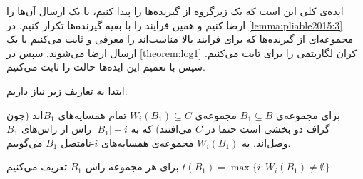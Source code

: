 ایده‌ی کلی این است که یک زیرگروه از گیرنده‌ها را پیدا کنیم، با یک ارسال آن‌ها را ارضا کنیم و همین فرایند را با بقیه گیرنده‌ها تکرار کنیم. در 
\autoref{lemma:pliable2015:3} 
مجموعه‌ای از گیرنده‌ها که برای فرایند بالا مناسب‌اند را معرفی و ثابت می‌کنیم با یک ارسال ارضا می‌شوند. سپس در 
\autoref{theorem:log1}
 کران لگاریتمی را برای
 ثابت می‌کنیم. سپس با تعمیم این ایده‌ها حالت
 را ثابت می‌کنیم.

ابتدا به تعاریف زیر نیاز داریم:
	\begin{definition}
	\label{def:nonnei}
	برای مجموعه‌ی
	$B_1 \subseteq B$
	مجموعه‌ی
	$W_i(B_1) \subseteq C$
	تمام همسایه‌های
	$B_1$اند (چون گراف دو بخشی است حتما در
	$C$
	 می‌افتند) که به 
	$|B_1| - i$
	راس از راس‌های
	$B_1$
	وصل‌اند. به
	$W_i(B_1)$
	مجموعه‌ی همسایه‌های
	$i$-نامتصل 
	$B_1$
	می‌گوییم.
\end{definition}
\begin{definition}
	برای هر مجموعه‌ راس
	$B_1$
	تعریف می‌کنیم 
	$t(B_1) = \max\{i: W_i(B_1) \neq \emptyset \}$
\end{definition}

